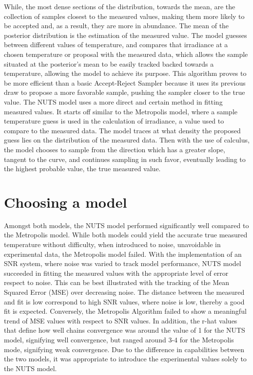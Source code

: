 \documentclass{article}
\begin{document}
While, the most dense sections of the distribution, towards the mean, are the collection of samples closest to the measured values, making them more likely to be accepted and, as a result, they are more in abundance. The mean of the posterior distribution is the estimation of the measured value. The model guesses between different values of temperature, and compares that irradiance at a chosen temperature or proposal with the measured data, which allows the sample situated at the posterior’s mean to be easily tracked backed towards a temperature, allowing the model to achieve its purpose. This algorithm proves to be more efficient than a basic Accept-Reject Sampler because it uses its previous draw to propose a more favorable sample, pushing the sampler closer to the true value. The NUTS model uses a more direct and certain method in fitting measured values. It starts off similar to the Metropolis model, where a sample temperature guess is used in the calculation of irradiance, a value used to compare to the measured data. The model traces at what density the proposed guess lies on the distribution of the measured data. Then with the use of calculus, the model chooses to sample from the direction which has a greater slope, tangent to the curve, and continues sampling in such favor, eventually leading to the highest probable value, the true measured value.

\section{Choosing a model}
Amongst both models, the NUTS model performed significantly well compared to the Metropolis model. While both models could yield the accurate true measured temperature without difficulty, when introduced to noise, unavoidable in experimental data, the Metropolis model failed. With the implementation of an SNR system, where noise was varied to track model performance, NUTS model succeeded in fitting the measured values with the appropriate level of error respect to noise. This can be best illustrated with the tracking of the Mean Squared Error (MSE) over decreasing noise. The distance between the measured and fit is low correspond to high SNR values, where noise is low, thereby a good fit is expected. Conversely, the Metropolis Algorithm failed to show a meaningful trend of MSE values with respect to SNR values. In addition, the r-hat values that define how well chains convergence was around the value of 1 for the NUTS model, signifying well convergence, but ranged around 3-4 for the Metropolis mode, signifying weak convergence. Due to the difference in capabilities between the two models, it was appropriate to introduce the experimental values solely to the NUTS model. 
\end{document}
